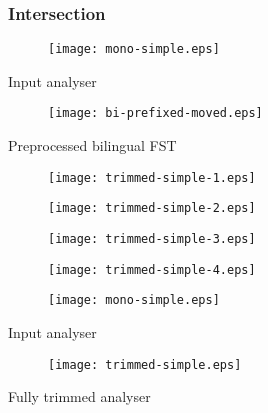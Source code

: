 \documentclass[notes=hide]{beamer}
\begin{document}
\begin{frame}
  \frametitle{Intersection}
  \begin{center}
    \begin{figure}[h]
      \texttt{[image: mono-simple.eps]}
    \end{figure}
    \scriptsize{Input analyser}
    \begin{figure}[h]
      \texttt{[image: bi-prefixed-moved.eps]}
    \end{figure}
    \scriptsize{Preprocessed bilingual FST}
  \end{center}
\end{frame}

\begin{frame}
  \begin{center}
    \begin{figure}[h]
      \texttt{[image: trimmed-simple-1.eps]}
    \end{figure}
  \end{center}
\end{frame}

\begin{frame}
  \begin{center}
    \begin{figure}[h]
      \texttt{[image: trimmed-simple-2.eps]}
    \end{figure}
  \end{center}
\end{frame}

\begin{frame}
  \begin{center}
    \begin{figure}[h]
      \texttt{[image: trimmed-simple-3.eps]}
    \end{figure}
  \end{center}
\end{frame}

\begin{frame}
  \begin{center}
    \begin{figure}[h]
      \texttt{[image: trimmed-simple-4.eps]}
    \end{figure}
  \end{center}
\end{frame}

\begin{frame}
  \begin{center}

    \begin{figure}[h]
      \texttt{[image: mono-simple.eps]}
    \end{figure}
    \scriptsize{Input analyser}

    \begin{figure}[h]
      \texttt{[image: trimmed-simple.eps]}
    \end{figure}
    \scriptsize{Fully trimmed analyser}

  \end{center}
\end{frame}
\end{document}
